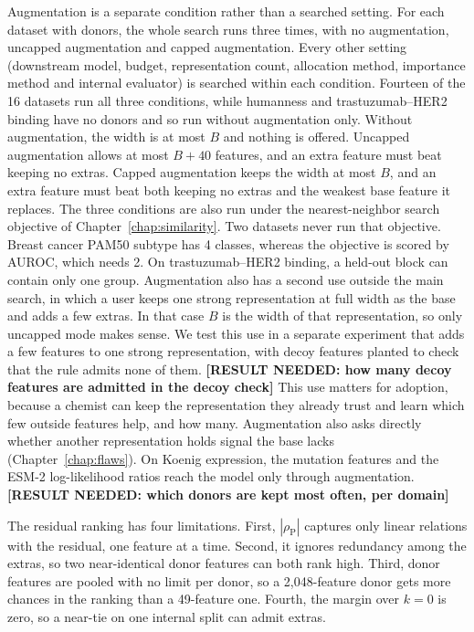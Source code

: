Augmentation is a separate condition rather than a searched setting. For each dataset with donors, the whole search runs three times, with no augmentation, uncapped augmentation and capped augmentation. Every other setting (downstream model, budget, representation count, allocation method, importance method and internal evaluator) is searched within each condition. Fourteen of the 16 datasets run all three conditions, while humanness and trastuzumab--HER2 binding have no donors and so run without augmentation only. Without augmentation, the width is at most $B$ and nothing is offered. Uncapped augmentation allows at most $B + 40$ features, and an extra feature must beat keeping no extras. Capped augmentation keeps the width at most $B$, and an extra feature must beat both keeping no extras and the weakest base feature it replaces. The three conditions are also run under the nearest-neighbor search objective of Chapter~\ref{chap:similarity}. Two datasets never run that objective. Breast cancer PAM50 subtype has 4 classes, whereas the objective is scored by AUROC, which needs 2. On trastuzumab--HER2 binding, a held-out block can contain only one group. Augmentation also has a second use outside the main search, in which a user keeps one strong representation at full width as the base and adds a few extras. In that case $B$ is the width of that representation, so only uncapped mode makes sense. We test this use in a separate experiment that adds a few features to one strong representation, with decoy features planted to check that the rule admits none of them. \textbf{[RESULT NEEDED: how many decoy features are admitted in the decoy check]} This use matters for adoption, because a chemist can keep the representation they already trust and learn which few outside features help, and how many. Augmentation also asks directly whether another representation holds signal the base lacks (Chapter~\ref{chap:flaws}). On Koenig expression, the mutation features and the ESM-2 log-likelihood ratios reach the model only through augmentation. \textbf{[RESULT NEEDED: which donors are kept most often, per domain]}

The residual ranking has four limitations. First, $|\rho_{\mathrm{P}}|$ captures only linear relations with the residual, one feature at a time. Second, it ignores redundancy among the extras, so two near-identical donor features can both rank high. Third, donor features are pooled with no limit per donor, so a 2,048-feature donor gets more chances in the ranking than a 49-feature one. Fourth, the margin over $k=0$ is zero, so a near-tie on one internal split can admit extras.

